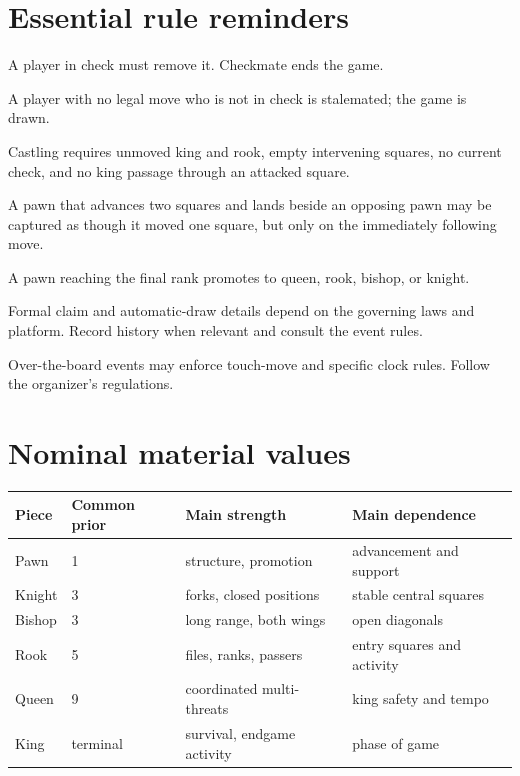 \section{Essential rule reminders}
\begin{description}[style=nextline,leftmargin=2.4em,labelsep=.5em]
\item[Check and mate.] A player in check must remove it. Checkmate ends the game.
\item[Stalemate.] A player with no legal move who is not in check is stalemated; the game is drawn.
\item[Castling.] Castling requires unmoved king and rook, empty intervening squares, no current check, and no king passage through an attacked square.
\item[En passant.] A pawn that advances two squares and lands beside an opposing pawn may be captured as though it moved one square, but only on the immediately following move.
\item[Promotion.] A pawn reaching the final rank promotes to queen, rook, bishop, or knight.
\item[Repetition and move-count draws.] Formal claim and automatic-draw details depend on the governing laws and platform. Record history when relevant and consult the event rules.
\item[Touch move and clock procedure.] Over-the-board events may enforce touch-move and specific clock rules. Follow the organizer's regulations.
\end{description}

\section{Nominal material values}
\begin{center}
\begin{tabularx}{.94\textwidth}{p{}p{}YY}
\toprule
Piece & Common prior & Main strength & Main dependence\\
\midrule
Pawn & 1 & structure, promotion & advancement and support\\
Knight & 3 & forks, closed positions & stable central squares\\
Bishop & 3 & long range, both wings & open diagonals\\
Rook & 5 & files, ranks, passers & entry squares and activity\\
Queen & 9 & coordinated multi-threats & king safety and tempo\\
King & terminal & survival, endgame activity & phase of game\\
\bottomrule
\end{tabularx}
\end{center}

